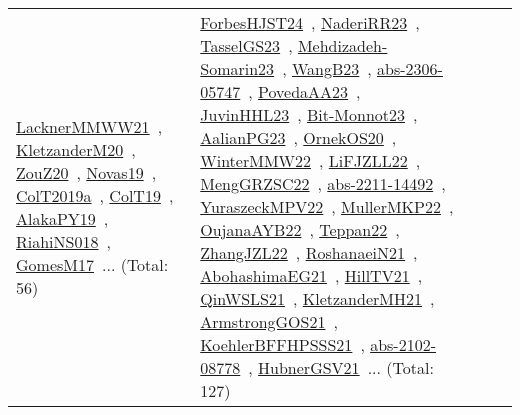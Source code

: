 {\begin{longtable}{lp{3cm}>{\raggedright\arraybackslash}p{6cm}>{\raggedright\arraybackslash}p{6cm}>{\raggedright\arraybackslash}p{8cm}}
\href{../works/LacknerMMWW21.pdf}{LacknerMMWW21}~\cite{LacknerMMWW21}, \href{../works/KletzanderM20.pdf}{KletzanderM20}~\cite{KletzanderM20}, \href{../works/ZouZ20.pdf}{ZouZ20}~\cite{ZouZ20}, \href{../works/Novas19.pdf}{Novas19}~\cite{Novas19}, \href{../works/ColT2019a.pdf}{ColT2019a}~\cite{ColT2019a}, \href{../works/ColT19.pdf}{ColT19}~\cite{ColT19}, \href{../works/AlakaPY19.pdf}{AlakaPY19}~\cite{AlakaPY19}, \href{../works/RiahiNS018.pdf}{RiahiNS018}~\cite{RiahiNS018}, \href{../works/GomesM17.pdf}{GomesM17}~\cite{GomesM17}... (Total: 56) & \href{../works/ForbesHJST24.pdf}{ForbesHJST24}~\cite{ForbesHJST24}, \href{../works/NaderiRR23.pdf}{NaderiRR23}~\cite{NaderiRR23}, \href{../works/TasselGS23.pdf}{TasselGS23}~\cite{TasselGS23}, \href{../works/Mehdizadeh-Somarin23.pdf}{Mehdizadeh-Somarin23}~\cite{Mehdizadeh-Somarin23}, \href{../works/WangB23.pdf}{WangB23}~\cite{WangB23}, \href{../works/abs-2306-05747.pdf}{abs-2306-05747}~\cite{abs-2306-05747}, \href{../works/PovedaAA23.pdf}{PovedaAA23}~\cite{PovedaAA23}, \href{../works/JuvinHHL23.pdf}{JuvinHHL23}~\cite{JuvinHHL23}, \href{../works/Bit-Monnot23.pdf}{Bit-Monnot23}~\cite{Bit-Monnot23}, \href{../works/AalianPG23.pdf}{AalianPG23}~\cite{AalianPG23}, \href{../works/OrnekOS20.pdf}{OrnekOS20}~\cite{OrnekOS20}, \href{../works/WinterMMW22.pdf}{WinterMMW22}~\cite{WinterMMW22}, \href{../works/LiFJZLL22.pdf}{LiFJZLL22}~\cite{LiFJZLL22}, \href{../works/MengGRZSC22.pdf}{MengGRZSC22}~\cite{MengGRZSC22}, \href{../works/abs-2211-14492.pdf}{abs-2211-14492}~\cite{abs-2211-14492}, \href{../works/YuraszeckMPV22.pdf}{YuraszeckMPV22}~\cite{YuraszeckMPV22}, \href{../works/MullerMKP22.pdf}{MullerMKP22}~\cite{MullerMKP22}, \href{../works/OujanaAYB22.pdf}{OujanaAYB22}~\cite{OujanaAYB22}, \href{../works/Teppan22.pdf}{Teppan22}~\cite{Teppan22}, \href{../works/ZhangJZL22.pdf}{ZhangJZL22}~\cite{ZhangJZL22}, \href{../works/RoshanaeiN21.pdf}{RoshanaeiN21}~\cite{RoshanaeiN21}, \href{../works/AbohashimaEG21.pdf}{AbohashimaEG21}~\cite{AbohashimaEG21}, \href{../works/HillTV21.pdf}{HillTV21}~\cite{HillTV21}, \href{../works/QinWSLS21.pdf}{QinWSLS21}~\cite{QinWSLS21}, \href{../works/KletzanderMH21.pdf}{KletzanderMH21}~\cite{KletzanderMH21}, \href{../works/ArmstrongGOS21.pdf}{ArmstrongGOS21}~\cite{ArmstrongGOS21}, \href{../works/KoehlerBFFHPSSS21.pdf}{KoehlerBFFHPSSS21}~\cite{KoehlerBFFHPSSS21}, \href{../works/abs-2102-08778.pdf}{abs-2102-08778}~\cite{abs-2102-08778}, \href{../works/HubnerGSV21.pdf}{HubnerGSV21}~\cite{HubnerGSV21}... (Total: 127)\\

\end{longtable}}

